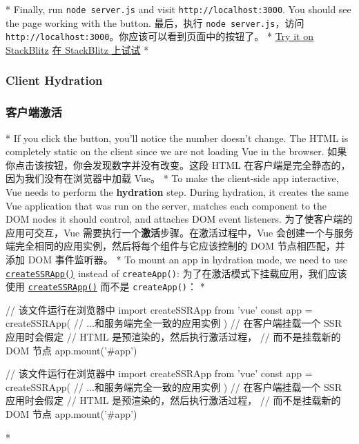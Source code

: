 \begin{paracol}{2}
 
\switchcolumn[0]*%
Finally, run \texttt{node\ server.js} and visit
\texttt{http://localhost:3000}. You should see the page working with the
button.
\switchcolumn
最后，执行 \texttt{node\ server.js}，访问
\texttt{http://localhost:3000}。你应该可以看到页面中的按钮了。
\switchcolumn[0]*%
\href{https://stackblitz.com/fork/vue-ssr-example-basic?file=index.js}{Try
it on StackBlitz}
\switchcolumn
\href{https://stackblitz.com/fork/vue-ssr-example-basic?file=index.js}{在
StackBlitz 上试试}
\switchcolumn[0]*%
\subsubsection{Client Hydration}
\switchcolumn
\subsubsection{客户端激活}
\switchcolumn[0]*%
If you click the button, you'll notice the number doesn't change. The
HTML is completely static on the client since we are not loading Vue in
the browser.
\switchcolumn
如果你点击该按钮，你会发现数字并没有改变。这段 HTML
在客户端是完全静态的，因为我们没有在浏览器中加载 Vue。
\switchcolumn[0]*%
To make the client-side app interactive, Vue needs to perform the
\textbf{hydration} step. During hydration, it creates the same Vue
application that was run on the server, matches each component to the
DOM nodes it should control, and attaches DOM event listeners.
\switchcolumn
为了使客户端的应用可交互，Vue
需要执行一个\textbf{激活}步骤。在激活过程中，Vue
会创建一个与服务端完全相同的应用实例，然后将每个组件与它应该控制的 DOM
节点相匹配，并添加 DOM 事件监听器。
\switchcolumn[0]*%
To mount an app in hydration mode, we need to use
\href{https://vuejs.org/api/application.html\#createssrapp}{\texttt{createSSRApp()}}
instead of \texttt{createApp()}:
\switchcolumn
为了在激活模式下挂载应用，我们应该使用
\href{https://cn.vuejs.org/api/application.html\#createssrapp}{\texttt{createSSRApp()}}
而不是 \texttt{createApp()}：
\switchcolumn[0]*%
\begin{codeJs}
// 该文件运行在浏览器中
import { createSSRApp } from 'vue'
const app = createSSRApp({
  // ...和服务端完全一致的应用实例
})
// 在客户端挂载一个 SSR 应用时会假定
// HTML 是预渲染的，然后执行激活过程，
// 而不是挂载新的 DOM 节点
app.mount('#app')
\end{codeJs}
\switchcolumn
\begin{codeJs}
// 该文件运行在浏览器中
import { createSSRApp } from 'vue'
const app = createSSRApp({
  // ...和服务端完全一致的应用实例
})
// 在客户端挂载一个 SSR 应用时会假定
// HTML 是预渲染的，然后执行激活过程，
// 而不是挂载新的 DOM 节点
app.mount('#app')
\end{codeJs}
\switchcolumn[0]*%

\end{paracol}
